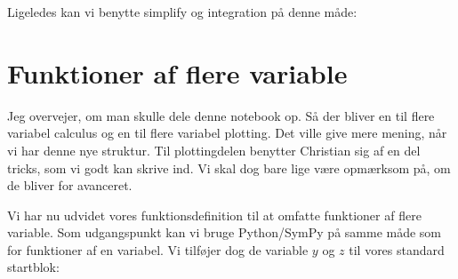 \documentclass[letterpaper,10pt,english]{jupyterBook}
\begin{document}
Ligeledes kan vi benytte simplify og integration på denne måde:

\begin{sphinxVerbatim}[commandchars=\\\{\}]
        

\end{sphinxVerbatim}

\noindent{}

\begin{sphinxVerbatim}[commandchars=\\\{\}]
          
\end{sphinxVerbatim}

\noindent{}

\begin{sphinxVerbatim}[commandchars=\\\{\}]
\end{sphinxVerbatim}

\noindent{}


\section{Funktioner af flere variable}
\label{\detokenize{notebooks/sympy/Notebook_FlereVar_analyse:funktioner-af-flere-variable}}\label{\detokenize{notebooks/sympy/Notebook_FlereVar_analyse::doc}}
Jeg overvejer, om man skulle dele denne notebook op. Så der bliver en til flere variabel calculus og en til flere variabel plotting. Det ville give mere mening, når vi har denne nye struktur.
Til plottingdelen benytter Christian sig af en del tricks, som vi godt kan skrive ind. Vi skal dog bare lige være opmærksom på, om de bliver for avanceret.

Vi har nu udvidet vores funktionsdefinition til at omfatte funktioner af flere variable. Som udgangspunkt kan vi bruge Python/SymPy på samme måde som for funktioner af en variabel. Vi tilføjer dog de variable \(y\) og \(z\)  til vores standard startblok:
\end{document}
